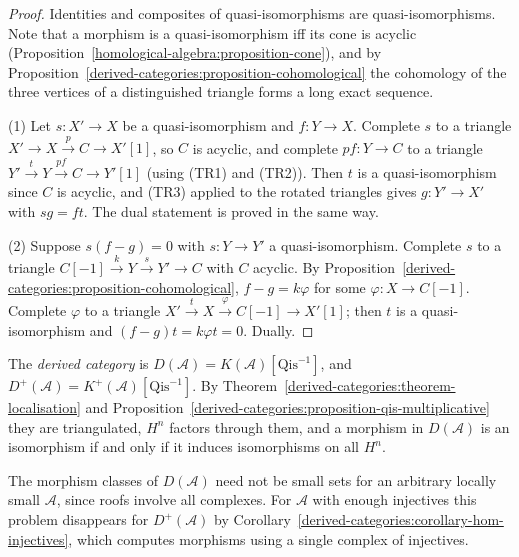 \begin{proof}
Identities and composites of quasi-isomorphisms are quasi-isomorphisms. Note that a morphism is a quasi-isomorphism iff its cone
is acyclic (Proposition~\ref{homological-algebra:proposition-cone}), and by
Proposition~\ref{derived-categories:proposition-cohomological} the cohomology of the three vertices of a distinguished triangle
forms a long exact sequence.

(1) Let $s \colon X' \to X$ be a quasi-isomorphism and $f \colon Y \to X$. Complete $s$ to a triangle $X' \to X \xrightarrow{p} C \to X'[1]$, so $C$ is
acyclic, and complete $pf \colon Y \to C$ to a triangle $Y' \xrightarrow{t} Y \xrightarrow{pf} C \to Y'[1]$ (using (TR1) and (TR2)). Then $t$ is a
quasi-isomorphism since $C$ is acyclic, and (TR3) applied to the rotated triangles gives $g \colon Y' \to X'$ with $sg = ft$. The dual
statement is proved in the same way.

(2) Suppose $s(f - g) = 0$ with $s \colon Y \to Y'$ a quasi-isomorphism. Complete $s$ to a triangle $C[-1] \xrightarrow{k} Y \xrightarrow{s} Y' \to C$ with $C$
acyclic. By Proposition~\ref{derived-categories:proposition-cohomological}, $f - g = k\varphi$ for some $\varphi \colon X \to C[-1]$. Complete $\varphi$ to a
triangle $X' \xrightarrow{t} X \xrightarrow{\varphi} C[-1] \to X'[1]$; then $t$ is a quasi-isomorphism and $(f - g)t = k\varphi t = 0$. Dually.
\end{proof}

\begin{definition}\label{derived-categories:definition-derived-category}
The \emph{derived category} is $D(\mathcal{A}) = K(\mathcal{A})[\mathrm{Qis}^{-1}]$, and $D^+(\mathcal{A}) = K^+(\mathcal{A})[\mathrm{Qis}^{-1}]$. By
Theorem~\ref{derived-categories:theorem-localisation} and Proposition~\ref{derived-categories:proposition-qis-multiplicative} they are
triangulated, $H^n$ factors through them, and a morphism in $D(\mathcal{A})$ is an isomorphism if and only if it induces
isomorphisms on all $H^n$.
\end{definition}

\begin{remark}\label{derived-categories:remark-size}
The morphism classes of $D(\mathcal{A})$ need not be small sets for an arbitrary locally small $\mathcal{A}$, since roofs involve all complexes.
For $\mathcal{A}$ with enough injectives this problem disappears for $D^+(\mathcal{A})$ by
Corollary~\ref{derived-categories:corollary-hom-injectives}, which computes morphisms using a single complex of injectives.
\end{remark}

